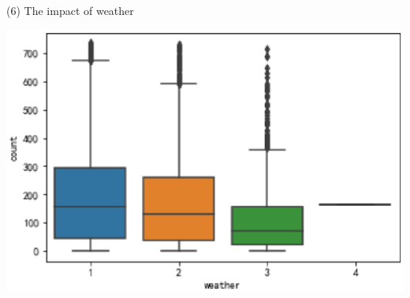 (6)  The impact of weather

\begin{center}
  \begin{minipage}{0.7\linewidth}
    \centering
    \includegraphics[height=0.7\textwidth]{pic/weather.eps}
  \end{minipage}
  \hfill
\end{center}

